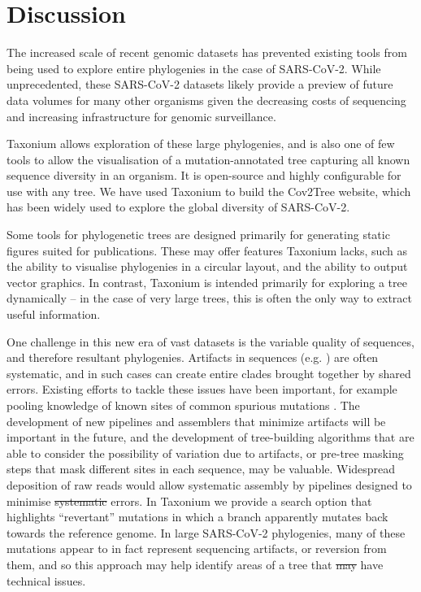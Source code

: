 \documentclass[twocolumn]{bioRxiv}
\providecommand{\DIFadd}[1]{{\protect\color{teal}#1}}
\providecommand{\DIFdel}[1]{{\protect\color{red}\sout{#1}}}
\providecommand{\DIFaddbegin}{}
\providecommand{\DIFaddend}{}
\providecommand{\DIFdelbegin}{}
\providecommand{\DIFdelend}{}
\begin{document}
\section*{Discussion}\label{s:discussion}

The increased scale of recent genomic datasets has prevented existing tools from being used to explore entire phylogenies in the case of SARS-CoV-2. While unprecedented, these SARS-CoV-2 datasets likely provide a preview of future data volumes for many other organisms given the decreasing costs of sequencing and increasing infrastructure for genomic surveillance.

Taxonium allows exploration of these large phylogenies, and is also one of few tools to allow the visualisation of a mutation-annotated tree capturing all known sequence diversity in an organism. It is open-source and highly configurable for use with any tree. We have used Taxonium to build the Cov2Tree website, which has been widely used to explore the global diversity of SARS-CoV-2.

Some tools for phylogenetic trees are designed primarily for generating static figures suited for publications. These may offer features Taxonium lacks, such as the ability to visualise phylogenies in a circular layout, and the ability to output vector graphics. In contrast, Taxonium is intended primarily for exploring a tree dynamically -- in the case of very large trees, this \DIFaddbegin \DIFadd{is }\DIFaddend often the only way to extract useful information.

One challenge in this new era of vast datasets is the variable quality of sequences, and therefore resultant phylogenies. Artifacts in sequences (e.g. \citet{pmid35130474,sanderson2021variation,sanderson2021systematic}) are often systematic, and in such cases can create entire clades brought together by shared errors. Existing efforts to tackle these issues have been important, for example pooling knowledge of known sites of common spurious mutations \citep{de2020masking}. The development of new pipelines and assemblers that minimize artifacts will be important in the future, and the development of tree-building algorithms that are able to consider the possibility of variation due to artifacts, or pre-tree masking steps that mask different sites in each sequence, may be valuable. Widespread deposition of raw reads would allow systematic assembly by pipelines designed to minimise \DIFdelbegin \DIFdel{systematic }\DIFdelend errors. In Taxonium we provide a search option that highlights ``revertant'' mutations in which a branch apparently mutates back towards the reference genome. In large SARS-CoV-2 phylogenies, many of these mutations appear to in fact represent sequencing artifacts, or reversion from them, and so this approach may help identify areas of a tree that  \DIFdelbegin \DIFdel{may }\DIFdelend have technical issues. 
\end{document}
